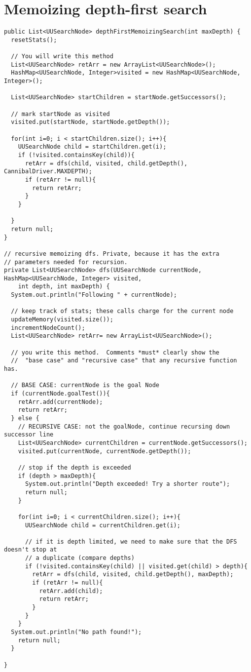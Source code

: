 \documentclass[a4paper]{report}
\begin{document}
\section{Memoizing depth-first search}
\begin{lstlisting}
public List<UUSearchNode> depthFirstMemoizingSearch(int maxDepth) {
  resetStats(); 
  
  // You will write this method
  List<UUSearchNode> retArr = new ArrayList<UUSearchNode>();
  HashMap<UUSearchNode, Integer>visited = new HashMap<UUSearchNode, Integer>();
  
  List<UUSearchNode> startChildren = startNode.getSuccessors();
  
  // mark startNode as visited
  visited.put(startNode, startNode.getDepth());

  for(int i=0; i < startChildren.size(); i++){
    UUSearchNode child = startChildren.get(i);
    if (!visited.containsKey(child)){
      retArr = dfs(child, visited, child.getDepth(), CannibalDriver.MAXDEPTH);
      if (retArr != null){
        return retArr;
      }
    }
    
  }
  return null;
}

// recursive memoizing dfs. Private, because it has the extra
// parameters needed for recursion.  
private List<UUSearchNode> dfs(UUSearchNode currentNode, HashMap<UUSearchNode, Integer> visited, 
    int depth, int maxDepth) {
  System.out.println("Following " + currentNode);
  
  // keep track of stats; these calls charge for the current node
  updateMemory(visited.size());
  incrementNodeCount();
  List<UUSearchNode> retArr= new ArrayList<UUSearchNode>();

  // you write this method.  Comments *must* clearly show the 
  //  "base case" and "recursive case" that any recursive function has.	
  
  // BASE CASE: currentNode is the goal Node
  if (currentNode.goalTest()){
    retArr.add(currentNode);
    return retArr;
  } else {
    // RECURSIVE CASE: not the goalNode, continue recursing down successor line
    List<UUSearchNode> currentChildren = currentNode.getSuccessors();
    visited.put(currentNode, currentNode.getDepth());
    
    // stop if the depth is exceeded
    if (depth > maxDepth){
      System.out.println("Depth exceeded! Try a shorter route");
      return null;
    }
    
    for(int i=0; i < currentChildren.size(); i++){
      UUSearchNode child = currentChildren.get(i);
      
      // if it is depth limited, we need to make sure that the DFS doesn't stop at 
      // a duplicate (compare depths)
      if (!visited.containsKey(child) || visited.get(child) > depth){
        retArr = dfs(child, visited, child.getDepth(), maxDepth);
        if (retArr != null){
          retArr.add(child);
          return retArr;
        }
      } 
    }
  System.out.println("No path found!");
    return null;
  }
  
}

\end{lstlisting}
\end{document}
